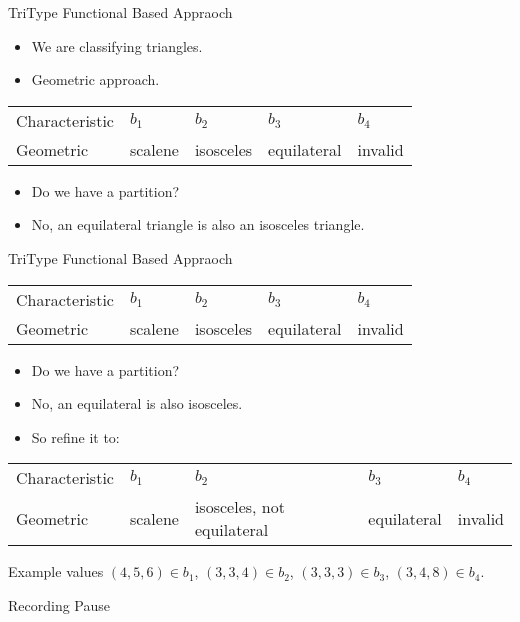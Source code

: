 \documentclass{beamer}
\newcommand{\pauseslide}{\begin{frame}{}
  \begin{center}
    Recording Pause
  \end{center}
  
\end{frame}}
\begin{document}
\begin{frame}{TriType  Functional Based Appraoch}
  \begin{itemize}
  \item We are classifying triangles.
  \item Geometric approach.
  \end{itemize}
  \begin{tabular}{||l|l|l|l|l||}\hline 
    Characteristic & $b_1$  & $b_2$ & $b_3$ & $b_4$\\
    Geometric  &  scalene & isosceles &
    equilateral & invalid \\
    \hline
  \end{tabular}
  \begin{itemize}
  \item Do we have a partition? 
  \item No, an equilateral triangle is also an isosceles triangle.
  \end{itemize}
\end{frame}
\begin{frame}{TriType  Functional Based Appraoch}
  \begin{tabular}{||l|l|l|l|l||}\hline 
    Characteristic & $b_1$  & $b_2$ & $b_3$ & $b_4$\\
    Geometric  &  scalene & isosceles &
    equilateral & invalid \\
    \hline
  \end{tabular}
  \begin{itemize}
  \item Do we have a partition? 
  \item No, an equilateral is also isosceles.
  \item So refine it to:
  \end{itemize}
{\small
  \begin{tabular}{||l|l|l|l|l||}\hline 
    Characteristic & $b_1$  & $b_2$ & $b_3$ & $b_4$\\
    Geometric  &  scalene & isosceles, not equilateral &
    equilateral & invalid \\
    \hline
  \end{tabular}
}
Example values $(4,5,6) \in b_1$,  $(3,3,4) \in b_2$, $(3,3,3) \in
b_3$, $(3,4,8) \in b_4$.
\end{frame}
\pauseslide
\end{document}
